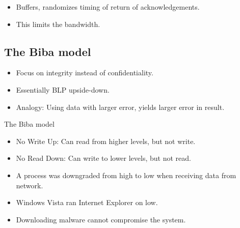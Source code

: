 \begin{frame}
  \begin{example}
    \begin{itemize}
      \item Buffers, randomizes timing of return of acknowledgements.
      \item This limits the bandwidth.
    \end{itemize}
  \end{example}
\end{frame}

\subsection{The Biba model}

\begin{frame}
  \begin{idea}
    \begin{itemize}
      \item Focus on integrity instead of confidentiality.
      \item Essentially BLP upside-down.
      \item Analogy: Using data with larger error, yields larger error in 
        result.
    \end{itemize}
  \end{idea}
\end{frame}

\begin{frame}
  \begin{block}{The Biba model}
    \begin{itemize}
      \item No Write Up: Can read from higher levels, but not write.
      \item No Read Down: Can write to lower levels, but not read.
    \end{itemize}
  \end{block}

  \pause

  \begin{example}
    \begin{itemize}
      \item A process was downgraded from high to low when receiving data from 
        network.
    \end{itemize}
  \end{example}

  \pause

  \begin{example}
    \begin{itemize}
      \item Windows Vista ran Internet Explorer on low.
      \item Downloading malware cannot compromise the system.
    \end{itemize}
  \end{example}
\end{frame}



\begin{frame}[allowframebreaks]
  \printbibliography{}
\end{frame}
